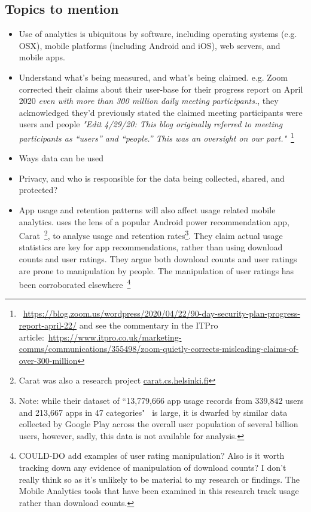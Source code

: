 \subsection{Topics to mention}
\begin{itemize}
    \item Use of analytics is ubiquitous by software, including operating systems (e.g. OSX), mobile platforms (including Android and iOS), web servers, and mobile apps. 
    \item Understand what's being measured, and what's being claimed. e.g. Zoom corrected their claims about their user-base for their progress report on  April 2020 \emph{even with more than 300 million daily meeting participants.}, they acknowledged they'd previously stated the claimed meeting participants were users and people \emph{"Edit 4/29/20: This blog originally referred to meeting participants as “users” and “people.” This was an oversight on our part."}~\footnote{~\url{https://blog.zoom.us/wordpress/2020/04/22/90-day-security-plan-progress-report-april-22/} and see the commentary in the ITPro article:~\url{https://www.itpro.co.uk/marketing-comms/communications/355498/zoom-quietly-corrects-misleading-claims-of-over-300-million}}
    \item Ways data can be used
    \item Privacy, and who is responsible for the data being collected, shared, and protected?
    \item App usage and retention patterns will also affect usage related mobile analytics. \cite{sigg2016_sovereignty_of_apps_there_s_more_to_relevance_than_downloads} uses the lens of a popular Android power recommendation app, Carat~\footnote{Carat was also a research project \url{carat.cs.helsinki.fi}}, to analyse usage and retention rates\footnote{Note: while their dataset of ``13,779,666 app usage records from 339,842 users and 213,667 apps in 47 categories"~\cite[page 3]{sigg2016_sovereignty_of_apps_there_s_more_to_relevance_than_downloads} is large, it is dwarfed by similar data collected by Google Play across the overall user population of several billion users, however, sadly, this data is not available for analysis.}. They claim actual usage statistics are key for app recommendations, rather than using download counts and user ratings. They argue both download counts and user ratings are prone to manipulation by people. The manipulation of user ratings has been corroborated elsewhere~\footnote{COULD-DO add examples of user rating manipulation? Also is it worth tracking down any evidence of manipulation of download counts? I don't really think so as it's unlikely to be material to my research or findings. The Mobile Analytics tools that have been examined in this research track usage rather than download counts.}
\end{itemize}

